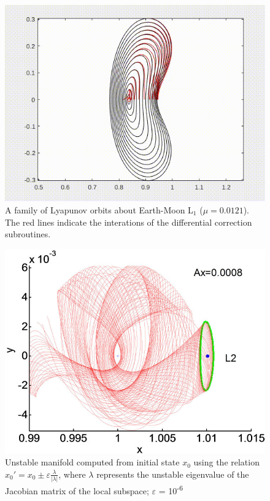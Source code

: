 \documentclass[paper=letter, fontsize=11pt]{article}
\begin{document}
\begin{figure}
\centering
\includegraphics[height=.25\textheight]{../presentation/gif/manifolds-330}
\caption{A family of Lyapunov orbits about Earth-Moon L$_1$ ($\mu = 0.0121$). The red lines indicate the interations of the differential correction subroutines.}
\label{f:lyapunov}
\end{figure}

\begin{figure}
\centering
\includegraphics[height=.25\textheight]{../presentation/manifoldtubes}
	\caption{Unstable manifold computed from initial state $x_0$ using the relation $x_0\prime = x_0 \pm \varepsilon\frac{\lambda}{\lvert \lambda \rvert}$, where $\lambda$ represents the unstable eigenvalue of the Jacobian matrix of the local subspace; $\varepsilon$ = 10\textsuperscript{-6}}
\label{f:manifolds}
\end{figure}
\end{document}
